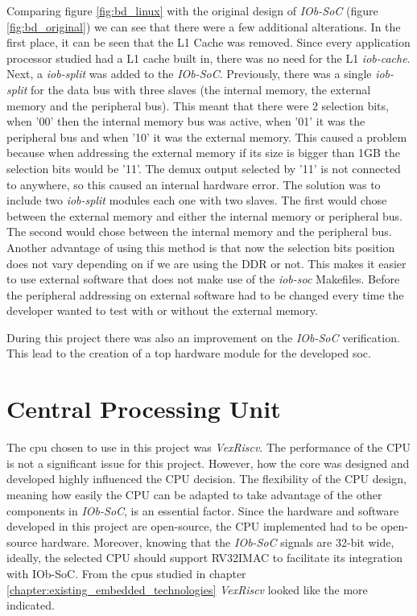 Comparing figure \ref{fig:bd_linux} with the original design of \textit{IOb-SoC} (figure \ref{fig:bd_original}) we can see that there were a few additional alterations. In the first place, it can be seen that the L1 Cache was removed. Since every application processor studied had a L1 cache built in, there was no need for the L1 \textit{iob-cache}. Next, a \textit{iob-split} was added to the \textit{IOb-SoC}. Previously, there was a single \textit{iob-split} for the data bus with three slaves (the internal memory, the external memory and the peripheral bus). This meant that there were 2 selection bits, when '00' then the internal memory bus was active, when '01' it was the peripheral bus and when '10' it was the external memory. This caused a problem because when addressing the external memory if its size is bigger than 1GB the selection bits would be '11'. The \acrfull{demux} output selected by '11' is not connected to anywhere, so this caused an internal hardware error. The solution was to include two \textit{iob-split} modules each one with two slaves. The first would chose between the external memory and either the internal memory or peripheral bus. The second would chose between the internal memory and the peripheral bus. Another advantage of using this method is that now the selection bits position does not vary depending on if we are using the DDR or not. This makes it easier to use external software that does not make use of the \textit{iob-soc} Makefiles. Before the peripheral addressing on external software had to be changed every time the developer wanted to test with or without the external memory.

During this project there was also an improvement on the \textit{IOb-SoC} verification. This lead to the creation of a top hardware module for the developed \acrlong{soc}.

\section{Central Processing Unit}
The \acrshort{cpu} chosen to use in this project was \textit{VexRiscv}. The performance of the CPU is not a significant issue for this project. However, how the core was designed and developed highly influenced the CPU decision. The flexibility of the CPU design, meaning how easily the CPU can be adapted to take advantage of the other components in \textit{IOb-SoC}, is an essential factor. Since the hardware and software developed in this project are open-source, the CPU implemented had to be open-source hardware. Moreover, knowing that the \textit{IOb-SoC} signals are 32-bit wide, ideally, the selected CPU should support RV32IMAC to facilitate its integration with IOb-SoC. From the \acrshort{cpu}s studied in chapter \ref{chapter:existing_embedded_technologies} \textit{VexRiscv} looked like the more indicated.

